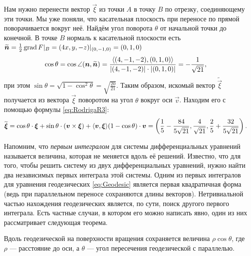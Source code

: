 \begin{solution}
	Нам нужно перенести вектор $\vec{\xi}$ из точки $A$ в точку $B$ по отрезку, соединяющему эти точки. Мы уже поняли, что касательная плоскость при переносе по прямой поворачивается вокруг неё. Найдём угол поворота $\theta$ от начальной точки до конечной. В точке $B$ нормаль к касательной плоскости есть $\widetilde{\boldsymbol{n}} = \frac{1}{2}\operatorname{grad} F|_{B} = (4x, y, -z)|_{(0, -1, 0)} = (0, 1, 0)$
	\[
		\cos\theta = \cos\angle(\boldsymbol{n}, \widetilde{\boldsymbol{n}}) = \frac{\langle(4, -1, -2), (0, 1, 0)\rangle}{\left\lvert(4, -1, -2)\right\rvert \cdot \left\lvert(0, 1, 0)\right\rvert} = -\frac{1}{\sqrt{21}},
	\]
	при этом $\sin\theta = \sqrt{1 - \cos^2\theta} = \sqrt{\frac{20}{21}}$. Таким образом, искомый вектор $\widetilde{\vec{\xi}}$ получается из вектора $\vec{\xi}$ поворотом на угол $\theta$ вокруг оси $\vec{v}$. Находим его с помощью формулы \eqref{eq:RodrigaR3}:
	\[
		\widetilde{\boldsymbol{\xi}} = \cos\theta \cdot \boldsymbol{\xi} + \sin\theta \cdot (\boldsymbol{v} \times \boldsymbol{\xi}) + \langle\boldsymbol{v}, \boldsymbol{\xi}\rangle(1 - \cos\theta) \cdot \boldsymbol{v} = \left(\frac{1}{5} - \frac{84}{5\sqrt{21}}, \frac{4}{\sqrt{21}}, \frac{2}{5} + \frac{32}{5\sqrt{21}}\right).
	\]
\end{solution}

Напомним, что \textit{первым интегралом} для системы дифференциальных уравнений называется величина, которая не меняется вдоль её решений. Известно, что для того, чтобы решить систему из двух дифференциальных уравнений, нужно найти два независимых первых интеграла этой системы. Одним из первых интегралов для уравнения геодезических \eqref{eq:Geodesic} является первая квадратичная форма (ведь при параллельном переносе сохраняются длины векторов). Нетривиальной частью нахождения геодезических является, по сути, поиск другого первого интеграла. Есть частные случаи, в котором его можно написать явно, один из них рассматривает следующая теорема.

\begin{theorem}[Клеро] \label{theorem:Clairaut}
	Вдоль геодезической на поверхности вращения сохраняется величина $\rho\cos\theta$, где $\rho$ --- расстояние до оси, а $\theta$ --- угол пересечения геодезической с параллелью.
\end{theorem}

